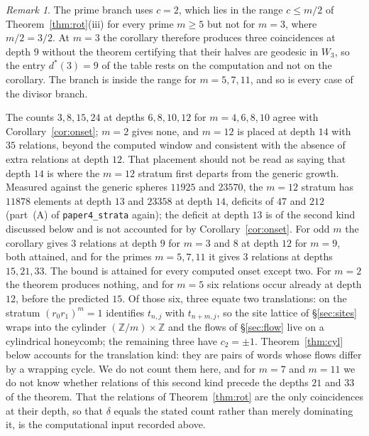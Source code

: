 \documentclass[11pt]{article}
\theoremstyle{definition}
\theoremstyle{remark}
\newtheorem{remark}[theorem]{Remark}
\newcommand{\Z}{\mathbb{Z}}
\begin{document}
\begin{remark}\label{rem:onset-m3}
The prime branch uses $c=2$, which lies in the range $c\le m/2$ of
Theorem~\ref{thm:rot}(iii) for every prime $m\ge5$ but not for $m=3$, where
$m/2=3/2$. At $m=3$ the corollary therefore produces three coincidences at
depth $9$ without the theorem certifying that their halves are geodesic in
$W_3$, so the entry $d^{*}(3)=9$ of the table rests on the computation and not
on the corollary. The branch is inside the range for $m=5,7,11$, and so is
every case of the divisor branch.
\end{remark}

The counts $3,8,15,24$ at depths $6,8,10,12$ for $m=4,6,8,10$ agree with
Corollary~\ref{cor:onset}; $m=2$ gives none, and $m=12$ is placed at depth
$14$ with $35$ relations, beyond the computed window and consistent with the
absence of extra relations at depth $12$. That placement should not be read as
saying that depth $14$ is where the $m=12$ stratum first departs from the generic
growth. Measured against the generic spheres $11925$ and $23570$, the $m=12$
stratum has $11878$ elements at depth $13$ and $23358$ at depth $14$, deficits of
$47$ and $212$ (part~(A) of \texttt{paper4\_strata} again); the deficit at depth
$13$ is of the second kind discussed below
and is not accounted for by Corollary~\ref{cor:onset}. For odd $m$ the corollary gives $3$
relations at depth $9$ for $m=3$ and $8$ at depth $12$ for $m=9$, both
attained, and for the primes $m=5,7,11$ it gives $3$ relations at depths
$15,21,33$. The bound is attained for every computed onset except two. For
$m=2$ the theorem produces nothing, and for $m=5$ six relations occur already
at depth $12$, before the predicted $15$. Of those six, three equate two
translations: on the stratum $(r_0r_1)^m=1$ identifies $t_{n,j}$ with
$t_{n+m,j}$, so the site lattice of \S\ref{sec:sites} wraps into the cylinder
$(\Z/m)\times\Z$ and the flows of \S\ref{sec:flow} live on a cylindrical
honeycomb; the remaining three have $c_2=\pm1$. Theorem~\ref{thm:cyl} below
accounts for the translation kind: they are pairs of words whose flows differ
by a wrapping cycle. We do not count them here, and for $m=7$ and $m=11$ we do
not know whether relations of this second kind precede the depths $21$ and
$33$ of the theorem. That the relations of
Theorem~\ref{thm:rot} are the only coincidences at their depth, so that
$\delta$ equals the stated count rather than merely dominating it, is the
computational input recorded above.
\end{document}
